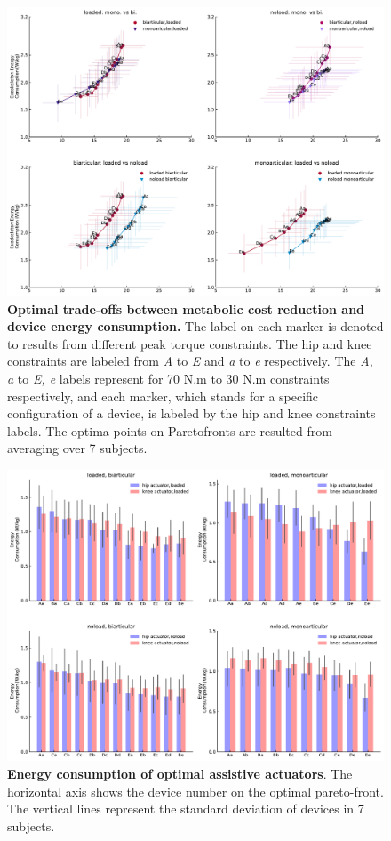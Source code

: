 \documentclass[10pt,letterpaper]{article}
\begin{document}
\begin{figure}[ht]   
	\centering
	\includegraphics[width=\linewidth]{Pareto_Simulations_Figures/PaperFigure_Main_Pareto.pdf}
	\vspace{1mm}
	\caption{{\small\textbf{Optimal trade-offs between metabolic cost reduction and device energy consumption.} The label on each marker is denoted to results from different peak torque constraints. The hip and knee constraints are labeled from {\it A} to {\it E} and {\it a} to {\it e} respectively. The {\it A, a} to {\it E, e} labels represent for 70 N.m to 30 N.m constraints respectively, and each marker, which stands for a specific configuration of a device, is labeled by the hip and knee constraints labels. The optima points on Paretofronts are resulted from averaging over 7 subjects.}}
	\label{Fig_Main_Paretofronts}
\end{figure}
\begin{figure}[ht]   
	\centering
	\includegraphics[width=\linewidth]{Pareto_Simulations_Figures/PaperFigure_Paretofront_EnergyBarPlot.pdf}
	\vspace{1mm}
	\caption{{\small\textbf{Energy consumption of optimal assistive actuators}. The horizontal axis shows the device number on the optimal pareto-front. The vertical lines represent the standard deviation of devices in 7 subjects.}}
	\label{Fig_Paretofronts_Actuators_EnergyBarPlot}
\end{figure}
\end{document}
